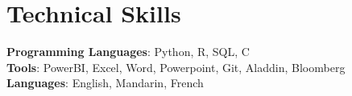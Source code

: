 \documentclass[letterpaper,11pt]{article}
\newcommand{\resumeItem}[1]{
  \item\small{
    {#1 \vspace{-2pt}}
  }
}
\newcommand{\resumeSubHeadingListEnd}{\end{itemize}}
\newcommand{\resumeItemListEnd}{\end{itemize}\vspace{-5pt}}
\begin{document}
        



\section{Technical Skills}
\begin{itemize}[leftmargin=0.15in, label={}]
   \small{\item{
    \textbf{Programming Languages}{: Python, R, SQL, C} \\
    \textbf{Tools}{: PowerBI, Excel, Word, Powerpoint, Git, Aladdin, Bloomberg} \\
    \textbf{Languages}{: English, Mandarin, French} \\
   }}
 \end{itemize}
\end{document}
